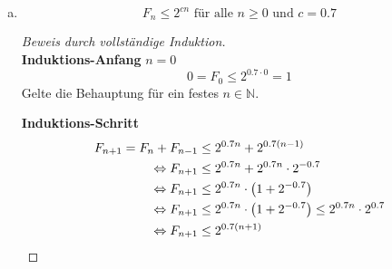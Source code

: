 \documentclass[a4paper]{scrartcl}
\begin{document}
\begin{enumerate}[(a)]
    \item
        \begin{behaupt}
            \begin{equation}
                F_n \leq 2^{cn} \text{ für alle } n \geq 0 \text{ und } c = \num{0,7}
            \end{equation}
        \end{behaupt}
        \begin{proof}[Beweis durch vollständige Induktion] \hfill \\
            \textbf{Induktions-Anfang} $n = 0$ \\
            \begin{equation}
                0 = F_0 \leq 2^{\num{0.7} \cdot 0} = 1
            \end{equation}
            Gelte die Behauptung für ein festes $n \in \mathbb{N}$.

            \textbf{Induktions-Schritt} \\
            \begin{equation}
                \begin{split}
                    F_{n+1} = F_n + F_{n-1} &\leq 2^{\num{0,7}n} + 2^{\num{0,7}(n-1)} \\
                    \Leftrightarrow F_{n+1} &\leq 2^{\num{0,7}n} + 2^{\num{0,7}n} \cdot 2^{\num{-0,7}} \\
                    \Leftrightarrow F_{n+1} &\leq 2^{\num{0,7}n} \cdot \left( 1 + 2^{\num{-0,7}} \right) \\
                    \Leftrightarrow F_{n+1} &\leq 2^{\num{0,7}n} \cdot \left( 1 + 2^{\num{-0,7}} \right) \leq 2^{\num{0,7}n} \cdot 2^{\num{0,7}} \\
                    \Leftrightarrow F_{n+1} &\leq 2^{\num{0,7}(n+1)} \\
                \end{split}
            \end{equation}
        \end{proof}
\end{enumerate}
\end{document}
